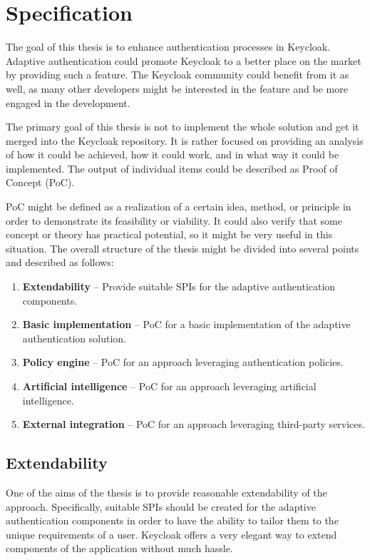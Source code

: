 \chapter{Specification}

The goal of this thesis is to enhance authentication processes in Keycloak.
Adaptive authentication could promote Keycloak to a better place on the market by providing such a feature. 
The Keycloak community could benefit from it as well, as many other developers might be interested in the feature and be more engaged in the development.

The primary goal of this thesis is not to implement the whole solution and get it merged into the Keycloak repository.
It is rather focused on providing an analysis of how it could be achieved, how it could work, and in what way it could be implemented.
The output of individual items could be described as Proof of Concept (PoC).

PoC might be defined as a realization of a certain idea, method, or principle in order to demonstrate its feasibility or viability.
It could also verify that some concept or theory has practical potential, so it might be very useful in this situation.\cite{spec-poc} 
\newline
\newline
The overall structure of the thesis might be divided into several points and described as follows:
\begin{enumerate}
    \item \textbf{Extendability} -- Provide suitable SPIs for the adaptive authentication components.
    \item \textbf{Basic implementation} -- PoC for a basic implementation of the adaptive authentication solution.
    \item \textbf{Policy engine} -- PoC for an approach leveraging authentication policies.
    \item \textbf{Artificial intelligence} -- PoC for an approach leveraging artificial intelligence. 
    \item \textbf{External integration} -- PoC for an approach leveraging third-party services.
\end{enumerate}

\newpage

\section{Extendability}
One of the aims of the thesis is to provide reasonable extendability of the approach.
Specifically, suitable SPIs should be created for the adaptive authentication components in order to have the ability to tailor them to the unique requirements of a user.
Keycloak offers a very elegant way to extend components of the application without much hassle.

